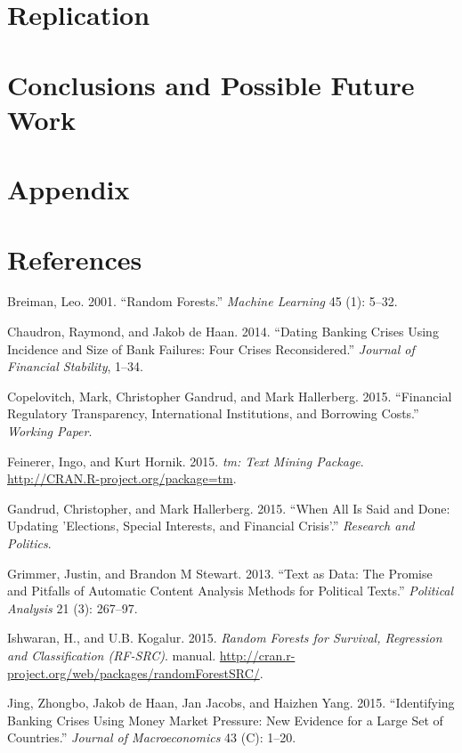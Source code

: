 \documentclass[]{article}
\begin{document}
\section{Replication}\label{replication}

\section{Conclusions and Possible Future
Work}\label{conclusions-and-possible-future-work}

\section{Appendix}\label{appendix}

\section*{References}\label{references}

Breiman, Leo. 2001. ``Random Forests.'' \emph{Machine Learning} 45 (1):
5--32.

Chaudron, Raymond, and Jakob de Haan. 2014. ``Dating Banking Crises
Using Incidence and Size of Bank Failures: Four Crises Reconsidered.''
\emph{Journal of Financial Stability}, 1--34.

Copelovitch, Mark, Christopher Gandrud, and Mark Hallerberg. 2015.
``Financial Regulatory Transparency, International Institutions, and
Borrowing Costs.'' \emph{Working Paper}.

Feinerer, Ingo, and Kurt Hornik. 2015. \emph{tm: Text Mining Package}.
\url{http://CRAN.R-project.org/package=tm}.

Gandrud, Christopher, and Mark Hallerberg. 2015. ``When All Is Said and
Done: Updating 'Elections, Special Interests, and Financial Crisis'.''
\emph{Research and Politics}.

Grimmer, Justin, and Brandon M Stewart. 2013. ``Text as Data: The
Promise and Pitfalls of Automatic Content Analysis Methods for Political
Texts.'' \emph{Political Analysis} 21 (3): 267--97.

Ishwaran, H., and U.B. Kogalur. 2015. \emph{Random Forests for Survival,
Regression and Classification (RF-SRC)}. manual.
\url{http://cran.r-project.org/web/packages/randomForestSRC/}.

Jing, Zhongbo, Jakob de Haan, Jan Jacobs, and Haizhen Yang. 2015.
``Identifying Banking Crises Using Money Market Pressure: New Evidence
for a Large Set of Countries.'' \emph{Journal of Macroeconomics} 43 (C):
1--20.
\end{document}
